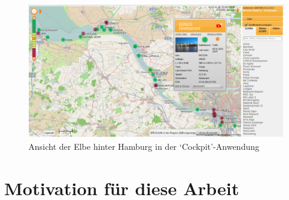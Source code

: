 \begin{figure}[H]
  \centering
  \includegraphics[width=6in]{images/Cockpit_Elbe}
  \caption[Ansicht der Elbe hinter Hamburg in der ‘Cockpit’-Anwendung]{Ansicht der Elbe hinter Hamburg in der ‘Cockpit’-Anwendung}
\end{figure}

\section{Motivation für diese Arbeit}\label{s.Motivation für diese Arbeit}

